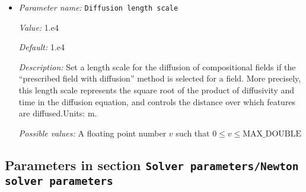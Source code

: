 \begin{itemize}
\item {\it Parameter name:} {\tt Diffusion length scale}
\label{parameters:Solver parameters/Diffusion solver parameters/Diffusion length scale}
\label{parameters:Solver_20parameters/Diffusion_20solver_20parameters/Diffusion_20length_20scale}


{\it Value:} 1.e4


{\it Default:} 1.e4


{\it Description:} Set a length scale for the diffusion of compositional fields if the ``prescribed field with diffusion'' method is selected for a field. More precisely, this length scale represents the square root of the product of diffusivity and time in the diffusion equation, and controls the distance over which features are diffused.Units: m.


{\it Possible values:} A floating point number $v$ such that $0 \leq v \leq \text{MAX\_DOUBLE}$
\end{itemize}

\subsection{Parameters in section \tt Solver parameters/Newton solver parameters}
\label{parameters:Solver_20parameters/Newton_20solver_20parameters}

